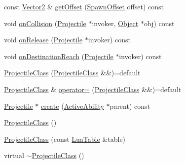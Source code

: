 \begin{DoxyCompactItemize}
\item 
const \hyperlink{classZeta_1_1Vector2}{Vector2} \& \hyperlink{classZeta_1_1ProjectileClass_a7d00a0113179c9cb57bbf18c85bf6768}{get\+Offset} (\hyperlink{classZeta_1_1ProjectileClass_a724c4a052d876f0b7ea61719cd020e46}{Spawn\+Offset} offset) const 
\item 
void \hyperlink{classZeta_1_1ProjectileClass_a7410837585e51ef07067f218802a914e}{on\+Collision} (\hyperlink{classZeta_1_1Projectile}{Projectile} $\ast$invoker, \hyperlink{classZeta_1_1Object}{Object} $\ast$obj) const 
\item 
void \hyperlink{classZeta_1_1ProjectileClass_a95bcce095c57f5186dfc8f7e774810f5}{on\+Release} (\hyperlink{classZeta_1_1Projectile}{Projectile} $\ast$invoker) const 
\item 
void \hyperlink{classZeta_1_1ProjectileClass_a56d6c2b029e7632bce7cef13f6507084}{on\+Destination\+Reach} (\hyperlink{classZeta_1_1Projectile}{Projectile} $\ast$invoker) const 
\item 
\hyperlink{classZeta_1_1ProjectileClass_a020e52aa99701f7537c550e3c073355e}{Projectile\+Class} (\hyperlink{classZeta_1_1ProjectileClass}{Projectile\+Class} \&\&)=default
\item 
\hyperlink{classZeta_1_1ProjectileClass}{Projectile\+Class} \& \hyperlink{classZeta_1_1ProjectileClass_a7fe1a7198f71c58d6b88700118bfde07}{operator=} (\hyperlink{classZeta_1_1ProjectileClass}{Projectile\+Class} \&\&)=default
\item 
\hyperlink{classZeta_1_1Projectile}{Projectile} $\ast$ \hyperlink{classZeta_1_1ProjectileClass_a295fcbeeea1b8b9c79e8b91646d6b7a0}{create} (\hyperlink{classZeta_1_1ActiveAbility}{Active\+Ability} $\ast$parent) const 
\item 
\hyperlink{classZeta_1_1ProjectileClass_af0970765a0af10075ee34a6a10e2bf21}{Projectile\+Class} ()
\item 
\hyperlink{classZeta_1_1ProjectileClass_abd64376c3f9259da43c7c7122196144f}{Projectile\+Class} (const \hyperlink{classZeta_1_1LuaTable}{Lua\+Table} \&table)
\item 
virtual \hyperlink{classZeta_1_1ProjectileClass_a43b7e22d15f394dd76041889f6a13b74}{$\sim$\+Projectile\+Class} ()
\end{DoxyCompactItemize}
